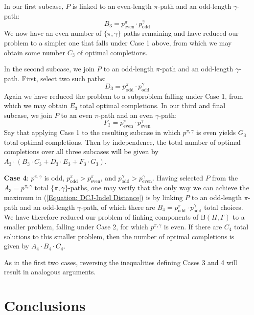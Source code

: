 In our first subcase, $P$ is linked to an even-length $\pi$-path and an odd-length $\gamma$-path:
\begin{equation}
B_3 = p^\pi_{\mathrm{even}} \cdot p^\gamma_{\mathrm{odd}}
\end{equation}
We now have an even number of $\{\pi, \gamma\}$-paths remaining and have reduced our problem to a simpler one that falls under Case 1 above, from which we may obtain some number $C_3$ of optimal completions.

In the second subcase, we join $P$ to an odd-length $\pi$-path and an odd-length $\gamma$-path.  First, select two such paths:
\begin{equation}
D_3 = p^\pi_{\mathrm{odd}} \cdot p^\gamma_{\mathrm{odd}}
\end{equation}
Again we have reduced the problem to a subproblem falling under Case 1, from which we may obtain $E_3$ total optimal completions.
In our third and final subcase, we join $P$ to an even $\pi$-path and an even $\gamma$-path:
\begin{equation}
F_3 = p^\pi_{\mathrm{even}} \cdot p^\gamma_{\mathrm{even}}
\end{equation}
Say that applying Case 1 to the resulting subcase in which $p^{\pi, \gamma}$ is even yields $G_3$ total optimal completions.   Then by independence, the total number of optimal completions over all three subcases will be given by $A_3 \cdot (B_3 \cdot C_3 + D_3 \cdot E_3 + F_3 \cdot G_3)$.

{\bf Case 4}: $p^{\pi, \gamma}$ is odd, $p^\pi_{\mathrm{odd}} > p^\pi_{\mathrm{even}}$, and $p^\gamma_{\mathrm{odd}} > p^\gamma_{\mathrm{even}}$. Having selected $P$ from the $A_3 = p^{\pi, \gamma}$ total $\{\pi, \gamma\}$-paths, one may verify that the only way we can achieve the maximum in (\ref{Equation: DCJ-Indel Distance}) is by linking $P$ to an odd-length $\pi$-path and an odd-length $\gamma$-path, of which there are $B_4 = p^{\pi}_{\mathrm{odd}} \cdot p^{\gamma}_{\mathrm{odd}}$ total choices.  We have therefore reduced our problem of linking components of $\mathrm{B}(\Pi, \Gamma)$ to a smaller problem, falling under Case 2, for which $p^{\pi, \gamma}$ is even.  If there are $C_4$ total solutions to this smaller problem, then the number of optimal completions is given by $A_4 \cdot B_4 \cdot C_4$.

As in the first two cases, reversing the inequalities defining Cases 3 and 4 will result in analogous arguments.

\section*{Conclusions}

